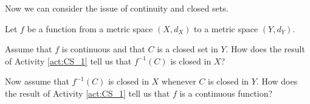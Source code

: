 \begin{comment}

\ActivitySolution

\ba
\item Let $x \in X \setminus f^{-1}(B)$.
	\begin{enumerate}[i.]
	\item Then $x \in X$ but $x \notin f^{-1}(B)$. That means $x \in X$ but $f(x) \notin B$. 

	\item Since $f(x) \notin B$, $f(x) \in (Y \setminus B)$ or $x \in f^{-1}(Y \setminus B)$. Thus, $(X \setminus f^{-1}(B)) \subseteq f^{-1}(Y \setminus B)$.
		
	\end{enumerate}
	
\item Let $x \in f^{-1}(Y \setminus B)$.
	\begin{enumerate}[i.]
	\item Then $f(x) \in (Y \setminus B)$. So $f(x) \notin f^{-1}(B)$. 

	\item We conclude that $f(x) \in (X \setminus f^{-1}(B))$. Thus, $ f^{-1}(Y \setminus B) \subseteq (X \setminus f^{-1}(B))$. 
		
	\end{enumerate}	

	\item The two containments in (a) and (b) show that $X \setminus f^{-1}(B) = f^{-1}(Y \setminus B)$.
	
\ea

\end{comment}

Now we can consider the issue of continuity and closed sets.

\begin{activity} \label{act:CS_2} Let $f$ be a function from a metric space $(X,d_X)$ to a metric space $(Y,d_Y)$. 
\ba
\item Assume that $f$ is continuous and that $C$ is a closed set in $Y$. How does the result of Activity \ref{act:CS_1} tell us that $f^{-1}(C)$ is closed in $X$?

\item Now assume that $f^{-1}(C)$ is closed in $X$ whenever $C$ is closed in $Y$. How does the result of Activity \ref{act:CS_1} tell us that $f$ is a continuous function?

\ea

\end{activity}

